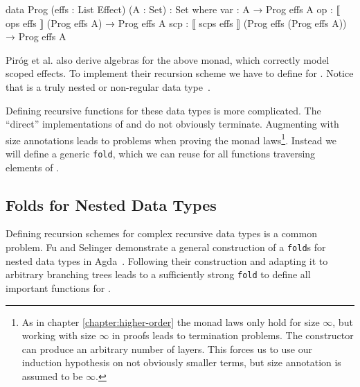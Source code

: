 \begin{code}
data Prog (effs : List Effect) (A : Set) : Set where
  var  :  A                                         → Prog effs A
  op   :  ⟦ ops  effs  ⟧ (Prog effs A)              → Prog effs A
  scp  :  ⟦ scps effs  ⟧ (Prog effs (Prog effs A))  → Prog effs A
\end{code}
Piróg et al. also derive algebras for the above monad, which correctly model
scoped effects.
To implement their recursion scheme we have to define \AgdaFunction{>>=} for 
\AgdaSpace{}\AgdaSpace{}.
Notice that  is a truly nested or non-regular data
type~\cite{DBLP:conf/mpc/BirdM98}.

Defining recursive functions for these data types is more complicated.
The ``direct'' implementations of  and \AgdaFunction{>>=}
do not obviously terminate.
Augmenting  with size annotations leads to problems when
proving the monad laws\footnote{As in chapter \ref{chapter:higher-order} the
  monad laws only hold for size $\infty$, but working with size $\infty$ in
  proofs leads to termination problems.
  The  constructor can produce an arbitrary number
  of \AgdaSpace{} layers.
  This forces us to use our induction hypothesis on not obviously smaller terms,
  but size annotation is assumed to be $\infty$.}.
Instead we will define a generic \texttt{fold}, which we can reuse for all
functions traversing elements of
\AgdaSpace{}\AgdaSpace{}.


\subsection{Folds for Nested Data Types}

Defining recursion schemes for complex recursive data types is a common problem.
Fu and Selinger demonstrate a general construction of a \texttt{fold}s for
nested data types in Agda~\cite{DBLP:journals/corr/abs-1806-05230}.
Following their construction and adapting it to arbitrary branching trees leads
to a sufficiently strong \texttt{fold} to define all important functions for
\AgdaSpace{}\AgdaSpace{}.

